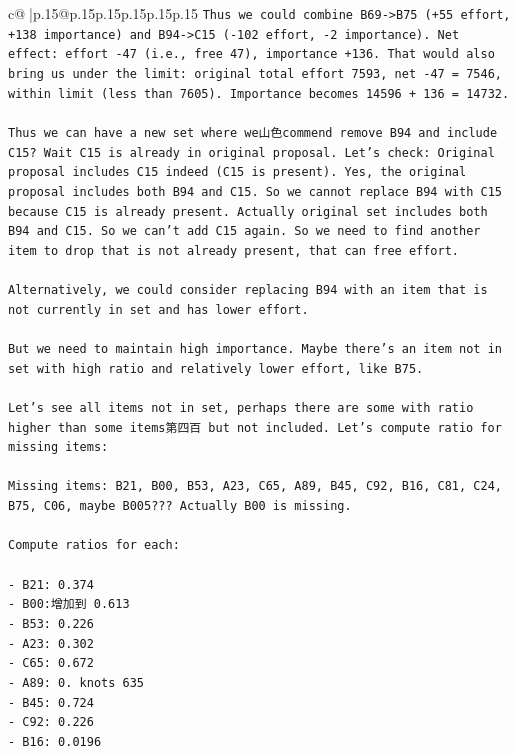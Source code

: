 \documentclass{article}
\begin{document}
{\begin{supertabular}{c@{$\;$}|p{.15\linewidth}@{}p{.15\linewidth}p{.15\linewidth}p{.15\linewidth}p{.15\linewidth}p{.15\linewidth}}
{{{\texttt{Thus we could combine B69{-}>B75 (+55 effort, +138 importance) and B94{-}>C15 ({-}102 effort, {-}2 importance). Net effect: effort {-}47 (i.e., free 47), importance +136. That would also bring us under the limit: original total effort 7593, net {-}47 = 7546, within limit (less than 7605). Importance becomes 14596 + 136 = 14732.} \\
\\ 
\texttt{Thus we can have a new set where we山色commend remove B94 and include C15? Wait C15 is already in original proposal. Let's check: Original proposal includes C15 indeed (C15 is present). Yes, the original proposal includes both B94 and C15. So we cannot replace B94 with C15 because C15 is already present. Actually original set includes both B94 and C15. So we can't add C15 again. So we need to find another item to drop that is not already present, that can free effort.} \\
\\ 
\texttt{Alternatively, we could consider replacing B94 with an item that is not currently in set and has lower effort.} \\
\\ 
\texttt{But we need to maintain high importance. Maybe there's an item not in set with high ratio and relatively lower effort, like B75.} \\
\\ 
\texttt{Let's see all items not in set, perhaps there are some with ratio higher than some items第四百 but not included. Let's compute ratio for missing items:} \\
\\ 
\texttt{Missing items: B21, B00, B53, A23, C65, A89, B45, C92, B16, C81, C24, B75, C06, maybe B005??? Actually B00 is missing.} \\
\\ 
\texttt{Compute ratios for each:} \\
\\ 
\texttt{{-} B21: 0.374} \\
\texttt{{-} B00:增加到 0.613} \\
\texttt{{-} B53: 0.226} \\
\texttt{{-} A23: 0.302} \\
\texttt{{-} C65: 0.672} \\
\texttt{{-} A89: 0. knots 635} \\
\texttt{{-} B45: 0.724} \\
\texttt{{-} C92: 0.226} \\
\texttt{{-} B16: 0.0196} \\
}}}
\end{supertabular}}
\end{document}
